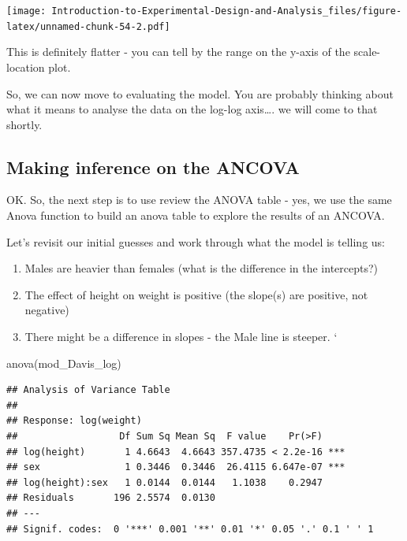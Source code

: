 \documentclass[
]{book}
\newenvironment{Shaded}{\begin{snugshade}}{\end{snugshade}}
\newcommand{\FunctionTok}[1]{\textcolor[rgb]{0.00,0.00,0.00}{#1}}
\newcommand{\NormalTok}[1]{#1}
\providecommand{\tightlist}{%
  \setlength{\itemsep}{0pt}\setlength{\parskip}{0pt}}
\begin{document}
\texttt{[image: Introduction-to-Experimental-Design-and-Analysis\_files/figure-latex/unnamed-chunk-54-2.pdf]}

This is definitely flatter - you can tell by the range on the y-axis of the scale-location plot.

So, we can now move to evaluating the model. You are probably thinking about what it means to analyse the data on the log-log axis\ldots. we will come to that shortly.

\hypertarget{making-inference-on-the-ancova}{%
\subsection{Making inference on the ANCOVA}\label{making-inference-on-the-ancova}}

OK. So, the next step is to use review the ANOVA table - yes, we use the same Anova function to build an anova table to explore the results of an ANCOVA.

Let's revisit our initial guesses and work through what the model is telling us:

\begin{enumerate}
\def\labelenumi{\arabic{enumi}.}
\tightlist
\item
  Males are heavier than females (what is the difference in the intercepts?)
\item
  The effect of height on weight is positive (the slope(s) are positive, not negative)
\item
  There might be a difference in slopes - the Male line is steeper.
  `
\end{enumerate}

\begin{Shaded}
\begin{Highlighting}[]
\FunctionTok{anova}\NormalTok{(mod\_Davis\_log)}
\end{Highlighting}
\end{Shaded}

\begin{verbatim}
## Analysis of Variance Table
## 
## Response: log(weight)
##                  Df Sum Sq Mean Sq  F value    Pr(>F)    
## log(height)       1 4.6643  4.6643 357.4735 < 2.2e-16 ***
## sex               1 0.3446  0.3446  26.4115 6.647e-07 ***
## log(height):sex   1 0.0144  0.0144   1.1038    0.2947    
## Residuals       196 2.5574  0.0130                       
## ---
## Signif. codes:  0 '***' 0.001 '**' 0.01 '*' 0.05 '.' 0.1 ' ' 1
\end{verbatim}
\end{document}
